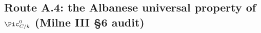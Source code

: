 \subsection{Route A.4: the Albanese universal property of \(\Pic^0_{C/k}\) (Milne III \S 6 audit)}
\label{sec:Jacobian_routeA4_albaneseUP}
